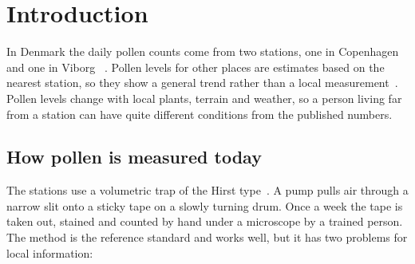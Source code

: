 \chapter{Introduction}\label{ch:introduction}

In Denmark the daily pollen counts come from two stations, one in Copenhagen and one in Viborg ~\cite{AstmaAllergi}.
Pollen levels for other places are estimates based on the nearest
station, so they show a general trend rather than a local measurement~\cite{AstmaAllergiDagens}. Pollen levels change
with local plants, terrain and weather, so a person living far from a station can have quite
different conditions from the published numbers. 

\section{How pollen is measured today}

The stations use a volumetric trap of the Hirst type~\cite{Hirst1952,EN16868}. A pump pulls
air through a narrow slit onto a sticky tape on a slowly turning drum. Once a week the tape is
taken out, stained and counted by hand under a microscope by a trained  person. The method is
the reference standard and works well, but it has two problems for local information:

